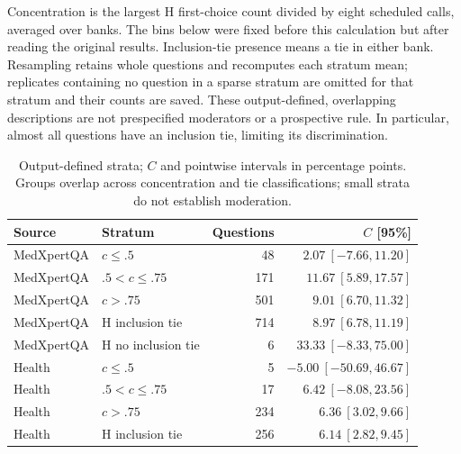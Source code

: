 Concentration is the largest H first-choice count divided by eight scheduled calls, averaged over banks. The bins below were fixed before this calculation but after reading the original results. Inclusion-tie presence means a tie in either bank. Resampling retains whole questions and recomputes each stratum mean; replicates containing no question in a sparse stratum are omitted for that stratum and their counts are saved. These output-defined, overlapping descriptions are not prespecified moderators or a prospective rule. In particular, almost all questions have an inclusion tie, limiting its discrimination.
\begin{table}[htbp]\centering\small
\caption{Output-defined strata; $C$ and pointwise intervals in percentage points. Groups overlap across concentration and tie classifications; small strata do not establish moderation.}
\label{tab:conditional}
\begin{tabular}{llrr}
\toprule
Source & Stratum & Questions & $C$ [95\%]\\
\midrule
MedXpertQA & $c\leq .5$ & 48 & $2.07\ [-7.66,11.20]$\\
MedXpertQA & $.5<c\leq .75$ & 171 & $11.67\ [5.89,17.57]$\\
MedXpertQA & $c>.75$ & 501 & $9.01\ [6.70,11.32]$\\
MedXpertQA & H inclusion tie & 714 & $8.97\ [6.78,11.19]$\\
MedXpertQA & H no inclusion tie & 6 & $33.33\ [-8.33,75.00]$\\
Health & $c\leq .5$ & 5 & $-5.00\ [-50.69,46.67]$\\
Health & $.5<c\leq .75$ & 17 & $6.42\ [-8.08,23.56]$\\
Health & $c>.75$ & 234 & $6.36\ [3.02,9.66]$\\
Health & H inclusion tie & 256 & $6.14\ [2.82,9.45]$\\
\bottomrule
\end{tabular}
\end{table}

